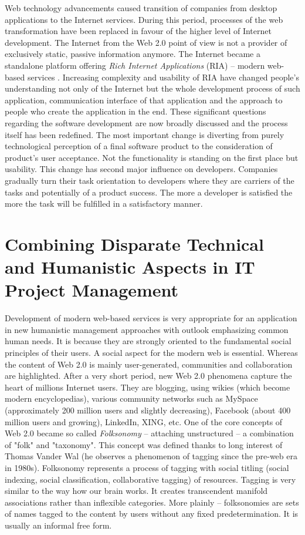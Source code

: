 \documentclass[graybox]{svmult}
\begin{document}
Web technology advancements caused transition of companies from desktop
applications to the Internet services. During this period, processes of the
web transformation have been replaced in favour of the higher level of
Internet development. The Internet from the Web 2.0 point of view is not
a provider of exclusively static, passive information anymore. The Internet
became a standalone platform offering \emph{Rich Internet Applications} (RIA)
-- modern web-based services \cite{o2007web}.  Increasing complexity and
usability of RIA have changed people's understanding not only of the Internet
but the whole development process of such application, communication interface
of that application and the approach to people who create the application in
the end.  These significant questions regarding the software development
\cite{pitner-priklady} are now broadly discussed and the process itself has
been redefined. The most important change is diverting from purely
technological perception of a final software product to the consideration of
product's user acceptance. Not the functionality is standing on the first
place but usability. This change has second major influence on developers.
Companies gradually turn their task orientation to developers where they are
carriers of the tasks and potentially of a product success. The more a
developer is satisfied the more the task will be fulfilled in a satisfactory
manner.

\section{Combining Disparate Technical and Humanistic Aspects in IT Project
Management}
Development of modern web-based services is very appropriate for an application
in new humanistic management approaches with outlook emphasizing common human
needs. It is because they are strongly oriented to the fundamental social
principles of their users. A social aspect for the modern web is essential.
Whereas the content of Web 2.0 is mainly user-generated, communities and
collaboration are highlighted. After a very short period, new Web 2.0 phenomena
capture the heart of millions Internet users. They are blogging, using wikies
(which become modern encyclopedias), various community networks such as
MySpace (approximately 200 million users and slightly decreasing), Facebook
(about 400 million users and growing), LinkedIn, XING, etc. One of the core
concepts of Web 2.0 became so called \emph{Folksonomy} -- attaching
unstructured -- a combination of "folk" and "taxonomy". This concept was
defined thanks to long interest of Thomas Vander Wal (he observes a phenomenon
of tagging since the pre-web era in 1980s). Folksonomy represents a process of
tagging with social titling (social indexing, social classification,
collaborative tagging) of resources. Tagging is very similar to the way how
our brain works. It creates transcendent manifold associations rather than
inflexible categories. More plainly -- folksonomies are sets of names tagged to
the content by users without any fixed predetermination. It is usually an
informal free form.
\end{document}
